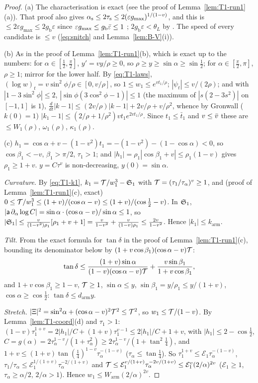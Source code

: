 \begin{proof}
(a) The characterisation is exact (see the proof of Lemma~\ref{lem:T1-run1}(a)). That proof also gives
$\alpha_{\mathrm s}\le2\tau_{\mathrm s}\le2(\varepsilon g_{\max})^{1/(1-v)}$, and this is $\le2\varepsilon g_{\max}\le2g_{\mathrm b}\varepsilon$ since
$\varepsilon g_{\max}\le g_{\mathrm b}\bar\varepsilon\le1$ ; $2g_{\mathrm b}\varepsilon<\theta_L$ by . The speed of every candidate
is $\le v$ (\eqref{eq:snitch} and Lemma~\ref{lem:B-V}(i)).

(b) As in the proof of Lemma~\ref{lem:T1-run1}(b), which is exact up to the numbers: for $\alpha\in[\frac12,\frac\pi2]$, $y'=vy/\rho\ge0$,
so $\rho\ge y\ge\sin\alpha\ge\sin\frac12$; for $\alpha\in[\frac\pi2,\pi]$, $\rho\ge1$; mirror for the lower half. By \eqref{eq:T1-laws},
$(\log w)_t=v\sin^2\!\phi/\rho\in[0,v/\rho]$, so $1\le w_1\le e^{vt_1/\rho}$; $|\psi_t|\le v/(2\rho)$; and with $|1-3\sin^2\!\phi|\le2$,
$|\sin\phi(3\cos^2\!\phi-1)|\le1$ (the maximum of $|s(2-3s^2)|$ on $[-1,1]$ is $1$),
$\frac d{dt}|k-1|\le(2v/\rho)|k-1|+2v/\rho+v/\rho^2$, whence by Gronwall ($k(0)=1$)
$|k_1-1|\le(2/\rho+1/\rho^2)vt_1e^{2vt_1/\rho}$. Since $t_1\le\bar t_1$ and $v\le\bar v$ these are $\le W_1(\rho)$, $\omega_1(\rho)$,
$\kappa_1(\rho)$.

(c) $h_1=\cos\alpha+v-(1-v^2)t_1=-(1-v^2)-(1-\cos\alpha)<0$, so $\cos\beta_1<-v$, $\beta_1>\pi/2$, $\tau_1>1$; and
$|h_1|=\rho_1|\cos\beta_1+v|\le\rho_1(1-v)$ gives $\rho_1\ge1+v$. $y=C\tau^v$ is non-decreasing, $y(0)=\sin\alpha$.

\emph{Curvature.} By \eqref{eq:T1-k1}, $k_1=\mathcal T/w_1^3-\mathfrak S_1$ with $\mathcal T=(\tau_1/\tau_\alpha)^v\ge1$, and (proof of
Lemma~\ref{lem:T1-run1}(c), exact) $0\le\mathcal T/w_1^3\le(1+v)/(\cos\alpha-v)\le(1+v)/(\cos\frac12-v)$. In $\mathfrak S_1$,
$|\mathsf a\,\partial_\alpha\log C|=\sin\alpha\cdot(\cos\alpha-v)/\sin\alpha\le1$, so
$|\mathfrak S_1|\le\frac v{(1-v^2)\rho_1}[\rho_1+v+1]=\frac v{1-v^2}+\frac v{(1-v)\rho_1}\le\frac{2v}{1-v^2}$. Hence $|k_1|\le k_{\mathrm{arm}}$.

\emph{Tilt.} From the exact formula for $\tan\delta$ in the proof of Lemma~\ref{lem:T1-run1}(c), bounding its denominator below by
$(1+v\cos\beta_1)(\cos\alpha-v)\mathcal T$:
\[
\tan\delta\le\frac{(1+v)\sin\alpha}{(1-v)(\cos\alpha-v)\mathcal T}+\frac{v\sin\beta_1}{1+v\cos\beta_1},
\]
and $1+v\cos\beta_1\ge1-v$, $\mathcal T\ge1$, $\sin\alpha\le y$, $\sin\beta_1=y/\rho_1\le y/(1+v)$, $\cos\alpha\ge\cos\frac12$:
$\tan\delta\le d_{\mathrm{arm}}y$.

\emph{Stretch.} $|\Xi|^2=\sin^2\!\alpha+(\cos\alpha-v)^2\mathcal T^2\le\mathcal T^2$, so $w_1\le\mathcal T/(1-v)$. By Lemma~\ref{lem:T1-coord}(d)
and $\tau_1>1$: $(1-v)\tau_1^{1+v}=2|h_1|/C+(1+v)\tau_1^{v-1}\le2|h_1|/C+1+v$, with $|h_1|\le2-\cos\frac12$,
$C=g(\alpha)=2\tau_\alpha^{1-v}/(1+\tau_\alpha^2)\ge2\tau_\alpha^{1-v}/(1+\tan^2\frac14)$, and
$1+v\le(1+v)\tan(\frac14)^{1-v}\tau_\alpha^{-(1-v)}$ ($\tau_\alpha\le\tan\frac14$). So
$\tau_1^{1+v}\le\mathcal E_1\tau_\alpha^{-(1-v)}$, $\tau_1/\tau_\alpha\le\mathcal E_1^{1/(1+v)}\tau_\alpha^{-2/(1+v)}$ and
$\mathcal T\le\mathcal E_1^{v/(1+v)}\tau_\alpha^{-2v/(1+v)}\le\mathcal E_1^{v}(2/\alpha)^{2v}$ ($\mathcal E_1\ge1$, $\tau_\alpha\ge\alpha/2$,
$2/\alpha>1$). Hence $w_1\le W_{\mathrm{arm}}(2/\alpha)^{2v}$.


\end{proof}
